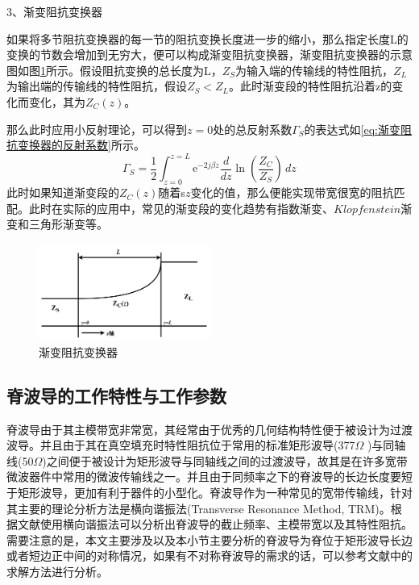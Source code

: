 \documentclass[master]{thesis-uestc}
\begin{document}
3、渐变阻抗变换器

如果将多节阻抗变换器的每一节的阻抗变换长度进一步的缩小，那么指定长度L的变换的节数会增加到无穷大，便可以构成渐变阻抗变换器，渐变阻抗变换器的示意图如图\ref{fig:渐变阻抗变换器}所示。假设阻抗变换的总长度为L，\(Z_S\)为输入端的传输线的特性阻抗，\(Z_L\)为输出端的传输线的特性阻抗，假设\(Z_S < Z_L \)。此时渐变段的特性阻抗沿着z的变化而变化，其为\(Z_C (z)\)。

那么此时应用小反射理论，可以得到\(z = 0\)处的总反射系数\(\Gamma_S\)的表达式如\ref{eq:渐变阻抗变换器的反射系数}所示。
\begin{equation}\label{eq:渐变阻抗变换器的反射系数}
    \Gamma_S = \frac{1}{2} \int_{z=0}^{z=L} \mathrm{e}^{-2 j \beta z}\frac{d}{d z} \ln \left(\frac{Z_C}{Z_S}\right)  \,dz
\end{equation}
此时如果知道渐变段的\(Z_C(z)\)随着s\(z\)变化的值，那么便能实现带宽很宽的阻抗匹配。此时在实际的应用中，常见的渐变段的变化趋势有指数渐变、\(Klopfenstein\)渐变和三角形渐变等。
\begin{figure}[htbp]
    \centering
    \includegraphics[width=0.5\textwidth]{pic/chapter2/渐变阻抗匹配示意图.png}
    \caption{渐变阻抗变换器}
    \label{fig:渐变阻抗变换器}
\end{figure}

\subsection{脊波导的工作特性与工作参数}\label{subsec:DoubleRidgeTheory}
脊波导由于其主模带宽非常宽，其经常由于优秀的几何结构特性便于被设计为过渡波导。并且由于其在真空填充时特性阻抗位于常用的标准矩形波导(377$\Omega$ )与同轴线(50$\Omega$)之间便于被设计为矩形波导与同轴线之间的过渡波导，故其是在许多宽带微波器件中常用的微波传输线之一。并且由于同频率之下的脊波导的长边长度要短于矩形波导，更加有利于器件的小型化。脊波导作为一种常见的宽带传输线，针对其主要的理论分析方法是横向谐振法(Transverse Resonance Method, TRM)。根据文献\cite{helszajn_double_ridge_2000, pingwang_double_ridge_2004,pingyingjiang_double_ridge_2007,hopefer_design_ridge_1955}使用横向谐振法可以分析出脊波导的截止频率、主模带宽以及其特性阻抗。需要注意的是，本文主要涉及以及本小节主要分析的脊波导为脊位于矩形波导长边或者短边正中间的对称情况，如果有不对称脊波导的需求的话，可以参考文献\cite{ramesh_asymmetri_2001}中的求解方法进行分析。
\end{document}
